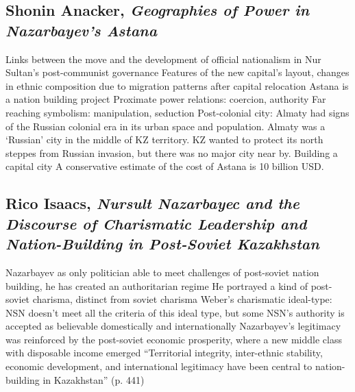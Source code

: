\documentclass{article}
\begin{document}
\subsection{Shonin Anacker, \textit{Geographies of Power in Nazarbayev's Astana}}\cite{anacker2004geographies}

\begin{outline}
	\1 Links between the move and the development of official nationalism in Nur Sultan's post-communist governance 
	\1 Features of the new capital's layout, changes in ethnic composition due to migration patterns after capital relocation
	\1 Astana is a nation building project
		\2 Proximate power relations: coercion, authority
		\2 Far reaching symbolism: manipulation, seduction
	\1 Post-colonial city: Almaty had signs of the Russian colonial era in its urban space and population. Almaty was a `Russian' city in the middle of KZ territory. KZ wanted to protect its north steppes from Russian invasion, but there was no major city near by. 
	\1 Building a capital city
		\2 A conservative estimate of the cost of Astana is 10 billion USD. 
\end{outline}

\subsection{Rico Isaacs, \textit{Nursult Nazarbayec and the Discourse of Charismatic Leadership and Nation-Building in Post-Soviet Kazakhstan}}\cite{isaacs2010papa}

\begin{outline}
	\1 Nazarbayev as only politician able to meet challenges of post-soviet nation building, he has created an authoritarian regime
		\2 He portrayed a kind of post-soviet charisma, distinct from soviet charisma
		\2 Weber's charismatic ideal-type: NSN doesn't meet all the criteria of this ideal type, but some
	\1 NSN's authority is accepted as believable domestically and internationally
	\1 Nazarbayev's legitimacy was reinforced by the post-soviet economic prosperity, where a new middle class with disposable income emerged 
	\1 ``Territorial integrity, inter-ethnic stability, economic development, and international legitimacy have been central to nation-building in Kazakhstan'' (p. 441)
\end{outline}

\begin{outline}
	\1
\end{outline}
\end{document}
